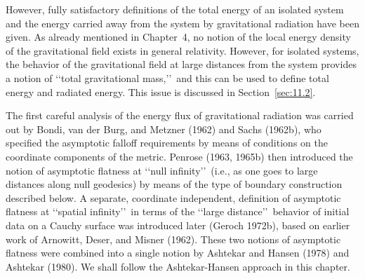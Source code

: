 However, fully satisfactory definitions of the total energy of an isolated system and
the energy carried away from the system by gravitational radiation have been given.
As already mentioned in Chapter~4, no notion of the local energy density of the
gravitational field exists in general relativity. However, for isolated systems, the
behavior of the gravitational field at large distances from the system provides a
notion of \lq\lq total gravitational mass,\rq\rq\ and this can be used to define total energy and
radiated energy. This issue is discussed in Section~\ref{sec:11.2}.

The first careful analysis of the energy flux of gravitational radiation was carried
out by Bondi, van der Burg, and Metzner (1962) and Sachs (1962b), who specified
the asymptotic falloff requirements by means of conditions on the coordinate
components of the metric. Penrose (1963, 1965b) then introduced the notion of
asymptotic flatness at \lq\lq null infinity\rq\rq\ (i.e., as one goes to large distances along null
geodesics) by means of the type of boundary construction described below. A
separate, coordinate independent, definition of asymptotic flatness at \lq\lq spatial
infinity\rq\rq\ in terms of the \lq\lq large distance\rq\rq\ behavior of initial data on a Cauchy
surface was introduced later (Geroch 1972b), based on earlier work of Arnowitt,
Deser, and Misner (1962). These two notions of asymptotic flatness were combined
into a single notion by Ashtekar and Hansen (1978) and Ashtekar (1980). We shall
follow the Ashtekar-Hansen approach in this chapter.
